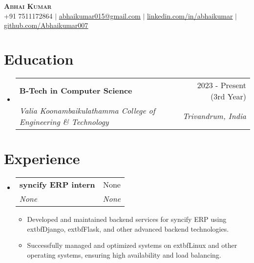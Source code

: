 \documentclass[letterpaper,11pt]{article}
\makeatletter
\newcommand{\resumeItem}[1]{
  \item\small{
    {#1 \vspace{-2pt}}
  }
}
\newcommand{\resumeSubheading}[4]{
  \vspace{-2pt}\item
    \begin{tabular*}{0.97\textwidth}[t]{l@{\extracolsep{\fill}}r}
      \textbf{#1} & #2 \\
      \textit{\small#3} & \textit{\small #4} \\
    \end{tabular*}\vspace{-7pt}
}
\newcommand{\resumeSubHeadingListStart}{\begin{itemize}[leftmargin=0.15in, label={}]}
\newcommand{\resumeSubHeadingListEnd}{\end{itemize}}
\newcommand{\resumeItemListStart}{\begin{itemize}}
\newcommand{\resumeItemListEnd}{\end{itemize}\vspace{-5pt}}
\makeatother
\begin{document}
\begin{center}
    \textbf{\Huge \scshape Abhai Kumar} \\ \vspace{1pt}
    \small +91 7511172864 $|$ \href{mailto:abhaikumar015@gmail.com}{\underline{abhaikumar015@gmail.com}} $|$ 
    \href{https://linkedin.com/in/abhaikumar}{\underline{linkedin.com/in/abhaikumar}} $|$
    \href{https://github.com/Abhaikumar007}{\underline{github.com/Abhaikumar007}}
\end{center}


\section{Education}
  \resumeSubHeadingListStart
      \resumeSubheading
      {B-Tech in Computer Science}{2023 - Present (3rd Year)}
      {Valia Koonambaikulathamma College of Engineering \& Technology}{Trivandrum, India}
    \resumeSubHeadingListEnd


\section{Experience}
  \resumeSubHeadingListStart
      \resumeSubheading
      {syncify ERP intern}{None}
      {None}{None}
      \resumeItemListStart
                \resumeItem{Developed and maintained backend services for syncify ERP using 	extbf{Django}, 	extbf{Flask}, and other advanced backend technologies.}
                \resumeItem{Successfully managed and optimized systems on 	extbf{Linux} and other operating systems, ensuring high availability and load balancing.}
              \resumeItemListEnd
    \resumeSubHeadingListEnd


\end{document}
